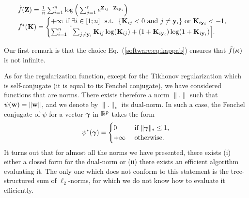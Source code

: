 \documentclass[a4paper, 11pt]{article}
\begin{document}
\begin{itemize}
$$\begin{array}{l}
                                                  \tilde{f}({\mathbf Z})=\frac{1}{n}\sum_{i=1}^n \log\Big(\sum_{j=1}^r e^{ {\mathbf Z}_{ij} - {\mathbf Z}_{i{\mathbf y}_i}}\Big)  \\
                                                     \tilde{f}^\ast({\mathbf K})=\begin{cases}
                                                     +\infty ~\text{if}~ \exists i \in[ 1;n ] ~~\text{s.t.}~~ \{ {\mathbf K}_{ij} < 0 ~\text{and}~ j \neq {\mathbf y}_i \} ~\text{or}~ {\mathbf K}_{i{\mathbf y}_i} < -1,\\
                                                        \sum_{i=1}^n \Big[\sum_{j \neq {\mathbf y}_i}{\mathbf K}_{ij}\log({\mathbf K}_{ij}) + (1+{\mathbf K}_{i {\mathbf y}_i})\log(1+{\mathbf K}_{i {\mathbf y}_i})\Big].
                                                        \end{cases}
                                                        \end{array}
                                                        $$
                                                        \end{itemize}

                                                        Our first remark is that the choice Eq.~(\ref{software:eq:kappab}) ensures
                                                        that $\tilde{f}({\boldsymbol\kappa})$ is not infinite.

                                                        As for the regularization function, except for the Tikhonov regularization
                                                        which is self-conjugate (it is equal to its Fenchel conjugate), we have
                                                        considered functions that are norms. There exists therefore a norm $\|.\|$ such
                                                        that $\psi({\mathbf w})=\|{\mathbf w}\|$, and we denote by $\|.\|_\ast$ its dual-norm.  In such a
                                                        case, the Fenchel conjugate of $\psi$ for a vector ${\boldsymbol\gamma}$ in ${\mathbb R}^p$ takes the
                                                        form
                                                        \begin{displaymath}
                                                        \psi^\ast({\boldsymbol\gamma}) = \begin{cases}
                                                        0 &~\text{if}~ \|{\boldsymbol\gamma}\|_\ast \leq 1, \\
                                                           +\infty &~\text{otherwise}.
                                                           \end{cases}
                                                           \end{displaymath}
It turns out that for almost all the norms we have presented, there exists (i)
   either a closed form for the dual-norm or (ii) there exists an
   efficient algorithm evaluating it. The only one which does not conform to this
   statement is the tree-structured sum of $\ell_2$-norms, for which we do not know
   how to evaluate it efficiently.
\end{document}
